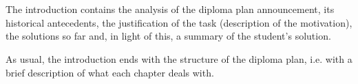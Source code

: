 \chapter{\bevezetes}

The introduction contains the analysis of the diploma plan announcement, its historical antecedents, the justification of the task (description of the motivation), the solutions so far and, in light of this, a summary of the student's solution.

As usual, the introduction ends with the structure of the diploma plan, i.e. with a brief description of what each chapter deals with.